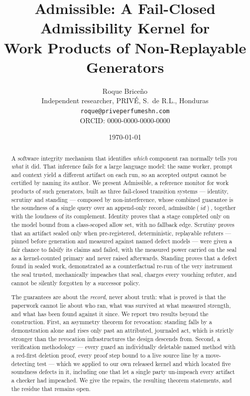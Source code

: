 \documentclass[11pt,a4paper]{article}
\title{Admissible: A Fail-Closed Admissibility Kernel for\\Work Products of Non-Replayable Generators}
\author{%
  Roque Brice\~no\\
  \small Independent researcher, PRIV\'E, S.\ de R.L., Honduras\\
  \small \texttt{roque@priveperfumeshn.com}\\
  \small ORCID: 0000-0000-0000-0000
}
\date{\today}
\theoremstyle{plain}
\theoremstyle{definition}
\theoremstyle{remark}
\newcommand{\adm}{\ensuremath{\mathrm{admissible}}}
\begin{document}
\maketitle

\begin{abstract}
A software integrity mechanism that identifies \emph{which} component ran normally tells you \emph{what} it did. That inference fails for a large language model: the same worker, prompt and context yield a different artifact on each run, so an accepted output cannot be certified by naming its author. We present Admissible, a reference monitor for work products of such generators, built as three fail-closed transition systems --- identity, scrutiny and standing --- composed by non-interference, whose combined guarantee is the soundness of a single query over an append-only record, $\adm(\mathit{id})$, together with the loudness of its complement. Identity proves that a stage completed only on the model bound from a class-scoped allow set, with no fallback edge. Scrutiny proves that an artifact sealed only when pre-registered, deterministic, replayable refuters --- pinned before generation and measured against named defect models --- were given a fair chance to falsify its claims and failed, with the measured power carried on the seal as a kernel-counted primary and never raised afterwards. Standing proves that a defect found in sealed work, demonstrated as a counterfactual re-run of the very instrument the seal trusted, mechanically impeaches that seal, charges every vouching refuter, and cannot be silently forgotten by a successor policy.

The guarantees are about the \emph{record}, never about truth: what is proved is that the paperwork cannot lie about who ran, what was survived at what measured strength, and what has been found against it since. We report two results beyond the construction. First, an asymmetry theorem for revocation: standing falls by a demonstration alone and rises only past an attributed, journaled act, which is strictly stronger than the revocation infrastructures the design descends from. Second, a verification methodology --- every guard an individually deletable named method with a red-first deletion proof, every proof step bound to a live source line by a move-detecting test --- which we applied to our own released kernel and which located five soundness defects in it, including one that let a single party un-impeach every artifact a checker had impeached. We give the repairs, the resulting theorem statements, and the residue that remains open.
\end{abstract}
\end{document}
